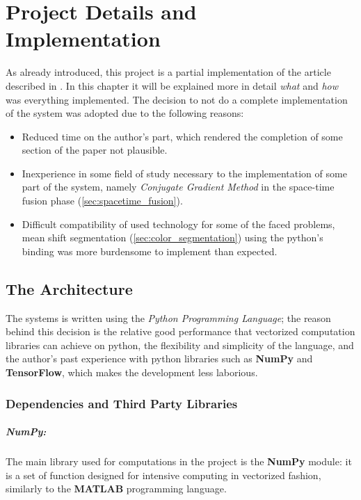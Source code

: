 \chapter{Project Details and Implementation}
\newcommand{\LongComment}[2]{\Comment{\parbox[t]{#1\linewidth}{#2}}}
As already introduced, this project is a partial implementation of the article described in \cite{Zhang2009}. In this chapter it will be explained more in detail \emph{what} and \emph{how} was everything implemented.
The decision to not do a complete implementation of the system was adopted due to the following reasons:
\begin{itemize}
\item Reduced time on the author's part, which rendered the completion of some section of the paper not plausible. 
\item Inexperience in some field of study necessary to the implementation of some part of the system, namely \emph{Conjugate Gradient Method} in the space-time fusion phase  (\cref{sec:spacetime_fusion}).
\item Difficult compatibility of used technology for some of the faced problems, \ie{} mean shift segmentation (\cref{sec:color_segmentation}) using the python's \OpenCV{} binding was more  burdensome to implement than expected.
\end{itemize}


\section{The Architecture}
The systems is written using the \emph{Python Programming Language}; the reason behind this decision is the relative good performance that vectorized computation libraries can achieve on python, the flexibility and simplicity of the language, and the author's past experience with python libraries such as \textbf{NumPy} and \textbf{TensorFlow}, which makes the development less laborious.

\subsection{Dependencies and Third Party Libraries}
\paragraph{NumPy:} The main library used for computations in the project is the \textbf{NumPy} module: it is a set of function designed for intensive computing in vectorized fashion, similarly to the \textbf{MATLAB} programming language.

